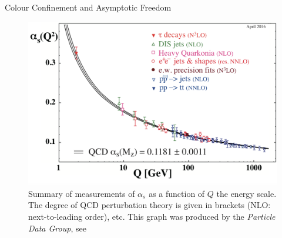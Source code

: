 \documentclass[14pt]{beamer}
\begin{document}
\begin{frame}[fragile]{Colour Confinement and Asymptotic Freedom}
\begin{figure} 
	\begin{center}
		\includegraphics[width=0.7 \textwidth]{as_allq.jpg}
		\caption{Summary of measurements of ${\alpha_s}$ as a function of ${Q}$ the energy scale. The degree of QCD perturbation theory is given in brackets (NLO: next-to-leading order), etc. This graph was produced by the \textit{Particle Data Group}, see \cite{PPB} }
		\label{allas}
	\end{center}
\end{figure}

\end{frame}
\end{document}
